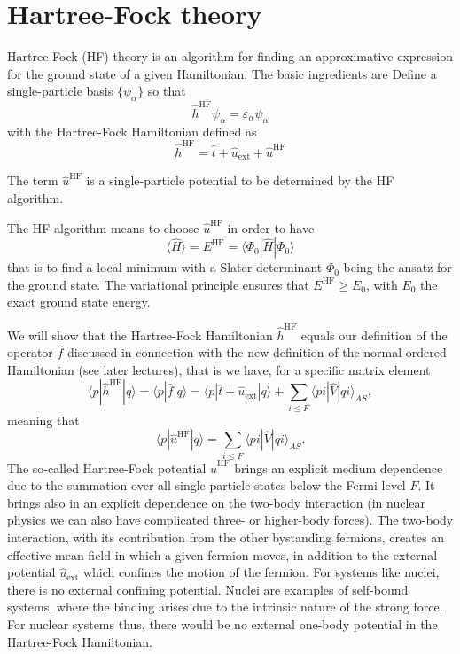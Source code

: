 \section{Hartree-Fock theory}

Hartree-Fock (HF) theory is an algorithm for finding an approximative
expression for the ground state of a given Hamiltonian. The basic
ingredients are Define a single-particle basis $\{\psi_{\alpha}\}$ so
that
\[ 
\hat{h}^{\mathrm{HF}}\psi_{\alpha} = \varepsilon_{\alpha}\psi_{\alpha}
\]
with the Hartree-Fock Hamiltonian defined as
\[
\hat{h}^{\mathrm{HF}}=\hat{t}+\hat{u}_{\mathrm{ext}}+\hat{u}^{\mathrm{HF}}
\]

The term $\hat{u}^{\mathrm{HF}}$ is a single-particle potential to be
determined by the HF algorithm.

The HF algorithm means to choose $\hat{u}^{\mathrm{HF}}$ in order to
have
\[ \langle \hat{H} \rangle = E^{\mathrm{HF}}= \langle \Phi_0 | \hat{H}|\Phi_0 \rangle
\]
that is to find a local minimum with a Slater determinant $\Phi_0$
being the ansatz for the ground state.  The variational principle
ensures that $E^{\mathrm{HF}} \ge E_0$, with $E_0$ the exact ground
state energy.

We will show that the Hartree-Fock Hamiltonian $\hat{h}^{\mathrm{HF}}$
equals our definition of the operator $\hat{f}$ discussed in
connection with the new definition of the normal-ordered Hamiltonian
(see later lectures), that is we have, for a specific matrix element
\[
\langle p |\hat{h}^{\mathrm{HF}}| q \rangle =\langle p |\hat{f}| q \rangle=\langle p|\hat{t}+\hat{u}_{\mathrm{ext}}|q \rangle +\sum_{i\le F} \langle pi | \hat{V} | qi\rangle_{AS},
\]
meaning that
\[
\langle p|\hat{u}^{\mathrm{HF}}|q\rangle = \sum_{i\le F} \langle pi | \hat{V} | qi\rangle_{AS}.
\]
The so-called Hartree-Fock potential $\hat{u}^{\mathrm{HF}}$ brings an
explicit medium dependence due to the summation over all
single-particle states below the Fermi level $F$. It brings also in an
explicit dependence on the two-body interaction (in nuclear physics we
can also have complicated three- or higher-body forces). The two-body
interaction, with its contribution from the other bystanding fermions,
creates an effective mean field in which a given fermion moves, in
addition to the external potential $\hat{u}_{\mathrm{ext}}$ which
confines the motion of the fermion. For systems like nuclei, there is
no external confining potential. Nuclei are examples of self-bound
systems, where the binding arises due to the intrinsic nature of the
strong force. For nuclear systems thus, there would be no external
one-body potential in the Hartree-Fock Hamiltonian.


